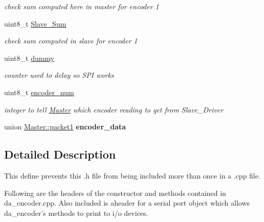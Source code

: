 \begin{DoxyCompactItemize}
\begin{DoxyCompactList}\small\item\em check sum computed here in master for encoder 1 \end{DoxyCompactList}\item 
\hypertarget{class_master_a7231699fbe88393c0d0ff693253f983a}{uint8\-\_\-t \hyperlink{class_master_a7231699fbe88393c0d0ff693253f983a}{Slave\-\_\-\-Sum}}\label{class_master_a7231699fbe88393c0d0ff693253f983a}

\begin{DoxyCompactList}\small\item\em check sum computed in slave for encoder 1 \end{DoxyCompactList}\item 
\hypertarget{class_master_a113205aa4218d33663faeeede6b1e8a9}{uint8\-\_\-t \hyperlink{class_master_a113205aa4218d33663faeeede6b1e8a9}{dummy}}\label{class_master_a113205aa4218d33663faeeede6b1e8a9}

\begin{DoxyCompactList}\small\item\em counter used to delay so S\-P\-I works \end{DoxyCompactList}\item 
\hypertarget{class_master_a1e3e8189d315b4bf7415fe03f4035a10}{uint8\-\_\-t \hyperlink{class_master_a1e3e8189d315b4bf7415fe03f4035a10}{encoder\-\_\-num}}\label{class_master_a1e3e8189d315b4bf7415fe03f4035a10}

\begin{DoxyCompactList}\small\item\em integer to tell \hyperlink{class_master}{Master} which encoder reading to get from Slave\-\_\-\-Driver \end{DoxyCompactList}\item 
\hypertarget{class_master_a96b723e105507a410c9d0e56398174f0}{union \hyperlink{union_master_1_1packet1}{Master\-::packet1} {\bfseries encoder\-\_\-data}}\label{class_master_a96b723e105507a410c9d0e56398174f0}

\end{DoxyCompactItemize}


\subsection{Detailed Description}
This define prevents this .h file from being included more than once in a .cpp file. 

Following are the headers of the constructor and methods contained in da\-\_\-encoder.\-cpp. Also included is aheader for a serial port object which allows da\-\_\-encoder's methods to print to i/o devices. 

